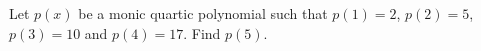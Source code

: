 Let $p(x)$ be a monic quartic polynomial such that $p(1)=2$, $p(2)=5$, $p(3)=10$ and $p(4)=17$. Find $p(5)$.
